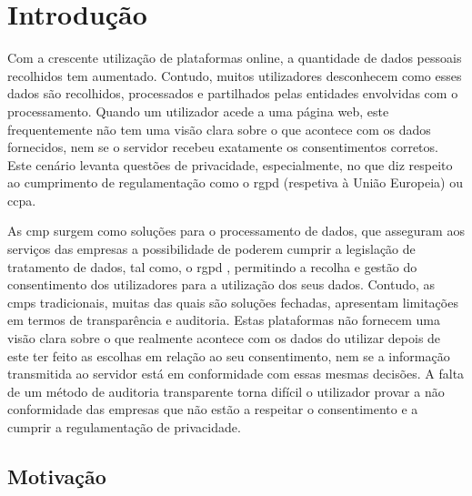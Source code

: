 \chapter{Introdução}
\label{cap:introducao}

Com a crescente utilização de plataformas online, a quantidade de dados pessoais recolhidos tem aumentado. Contudo, muitos utilizadores desconhecem como esses dados são recolhidos, processados e partilhados pelas entidades envolvidas com o processamento. Quando um utilizador acede a uma página web, este frequentemente não tem uma visão clara sobre o que acontece com os dados fornecidos, nem se o servidor recebeu exatamente os consentimentos corretos. Este cenário levanta questões de privacidade, especialmente, no que diz respeito ao cumprimento de regulamentação como o \acrfull{rgpd} (respetiva à União Europeia) ou \acrfull{ccpa}.

As \acrfull{cmp} surgem como soluções para o processamento de dados, que asseguram aos serviços das empresas a possibilidade de poderem cumprir a legislação de tratamento de dados, tal como, o \acrshort{rgpd} \citep{Santos2021}, permitindo a recolha e gestão do consentimento dos utilizadores para a utilização dos seus dados. Contudo, as \acrshort{cmp}s tradicionais, muitas das quais são soluções fechadas, apresentam limitações em termos de transparência e auditoria. 
Estas plataformas não fornecem uma visão clara sobre o que realmente acontece com os dados do utilizar depois de este ter feito as escolhas em relação ao seu consentimento, nem se a informação transmitida ao servidor está em conformidade com essas mesmas decisões. A falta de um método de auditoria transparente torna difícil o utilizador provar a não conformidade das empresas que não estão a respeitar o consentimento e a cumprir a regulamentação de privacidade.

\section{Motivação}

